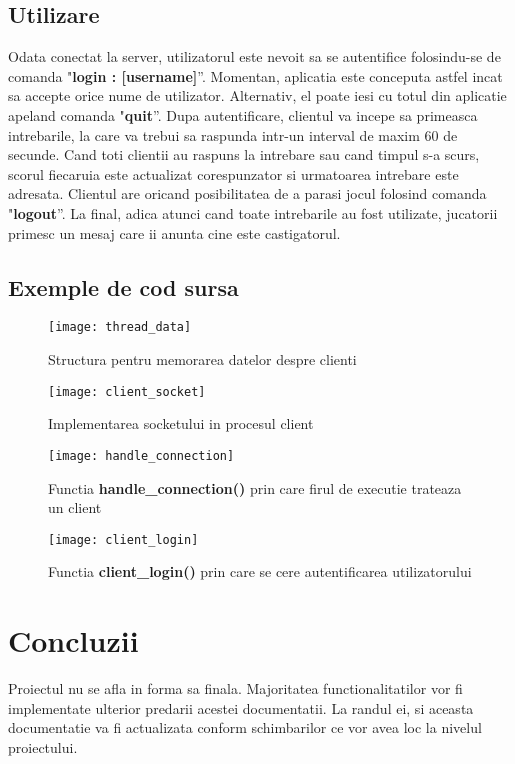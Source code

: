 \documentclass[runningheads]{llncs}
\begin{document}
\subsection{Utilizare}
Odata conectat la server, utilizatorul este nevoit sa se autentifice folosindu-se de comanda "\textbf{login : [username]}”.
Momentan, aplicatia este conceputa astfel incat sa accepte orice nume de utilizator.
Alternativ, el poate iesi cu totul din aplicatie apeland comanda "\textbf{quit}”.
Dupa autentificare, clientul va incepe sa primeasca intrebarile, la care va trebui sa raspunda intr-un interval de maxim 60 de secunde.
Cand toti clientii au raspuns la intrebare sau cand timpul s-a scurs, scorul fiecaruia este actualizat corespunzator si urmatoarea intrebare este adresata.
Clientul are oricand posibilitatea de a parasi jocul folosind comanda "\textbf{logout}”.
La final, adica atunci cand toate intrebarile au fost utilizate, jucatorii primesc un mesaj care ii anunta cine este castigatorul.

\subsection{Exemple de cod sursa}
\begin{figure}[H]
\centering
\texttt{[image: thread\_data]}
\caption{Structura pentru memorarea datelor despre clienti}
\end{figure}

\begin{figure}[H]
\centering
\texttt{[image: client\_socket]}
\caption{Implementarea socketului in procesul client}
\end{figure}

\begin{figure}[H]
\centering
\texttt{[image: handle\_connection]}
\caption{Functia \textbf{handle\_connection()} prin care firul de executie trateaza un client}
\end{figure}
\vskip 3cm
\begin{figure}[H]
\centering
\texttt{[image: client\_login]}
\caption{Functia \textbf{client\_login()} prin care se cere autentificarea utilizatorului}
\end{figure}
\newpage


\section{Concluzii}
Proiectul nu se afla in forma sa finala. Majoritatea functionalitatilor vor fi implementate ulterior predarii acestei documentatii.
La randul ei, si aceasta documentatie va fi actualizata conform schimbarilor ce vor avea loc la nivelul proiectului.
\end{document}
